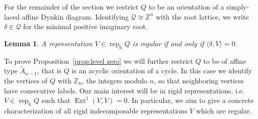 \documentclass[12pt]{amsart}
\newcommand{\ZZ}{\mathbb{Z}}
\newcommand{\kk}{\Bbbk}%
\newcommand{\cQ}{\mathcal{Q}}
\newcommand{\rep}{\operatorname{rep}}
\DeclareMathOperator{\Ext}{Ext}
\newtheorem{lemma}[theorem]{Lemma}
\theoremstyle{remark}
\numberwithin{equation}{section}
\begin{document}
  For the remainder of the section we restrict $Q$ to be an orientation of a simply-laced affine Dynkin diagram.
  Identifying $\cQ\cong\ZZ^n$ with the root lattice, we write $\delta\in\cQ$ for the minimal positive imaginary root.
  \begin{lemma}\cite{ASS06}
      A representation $V\in\rep_\kk Q$ is regular if and only if $\langle\delta,V\rangle=0$.
  \end{lemma}

  To prove Proposition~\ref{prop:level zero} we will further restrict $Q$ to be of affine type $\tilde{A}_{n-1}$, that is $Q$ is an acyclic orientation of a cycle.  
  In this case we identify the vertices of $Q$ with $\ZZ_n$, the integers modulo $n$, so that neighboring vertices have consecutive labels.
  Our main interest will be in rigid representations, i.e. $V\in\rep_\kk Q$ such that $\Ext^1(V,V)=0$.  
  In particular, we aim to give a concrete characterization of all rigid indecomposable representations $V$ which are regular.
\end{document}
